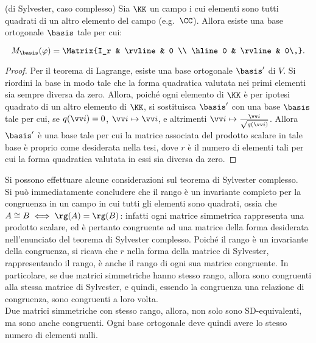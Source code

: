 \documentclass[11pt]{article}
\begin{document}
	\begin{theorem} (di Sylvester, caso complesso)
		Sia $\KK$ un campo i cui elementi sono tutti quadrati di un
		altro elemento del campo (e.g.~$\CC$). Allora esiste una base
		ortogonale $\basis$ tale per cui:
		
		\[ M_\basis(\varphi) = \Matrix{I_r & \rvline & 0 \\ \hline 0 & \rvline & 0\,}. \]
	\end{theorem}

	\begin{proof}
		Per il teorema di Lagrange, esiste una base ortogonale $\basis'$ di $V$.
		Si riordini la base in modo tale che la forma quadratica valutata nei primi elementi sia sempre diversa da zero. Allora, poiché ogni
		elemento di $\KK$ è per ipotesi quadrato di un altro elemento
		di $\KK$, si sostituisca $\basis'$ con una base $\basis$ tale per
		cui, se $q(\vv i) = 0$, $\vv i \mapsto \vv i$, e altrimenti
		$\vv i \mapsto \frac{\vv i}{\sqrt{q(\vv i)}}$. Allora $\basis'$
		è una base tale per cui la matrice associata del prodotto scalare
		in tale base è proprio come desiderata nella tesi, dove $r$ è
		il numero di elementi tali per cui la forma quadratica valutata
		in essi sia diversa da zero.
	\end{proof}

	\begin{remark}
		Si possono effettuare alcune considerazioni sul teorema di Sylvester
		complesso. \\
		
		\li Si può immediatamente concludere che il rango è un invariante
		completo per la congruenza in un campo in cui tutti gli elementi
		sono quadrati, ossia che $A \cong B \iff \rg(A) = \rg(B)$: infatti
		ogni matrice simmetrica rappresenta una prodotto scalare, ed è
		pertanto congruente ad una matrice della forma desiderata
		nell'enunciato del teorema di Sylvester complesso. Poiché il rango
		è un invariante della congruenza, si ricava che $r$ nella forma
		della matrice di Sylvester, rappresentando il rango, è anche
		il rango di ogni sua matrice congruente. In particolare, se due
		matrici simmetriche hanno stesso rango, allora sono congruenti
		alla stessa matrice di Sylvester, e quindi, essendo la congruenza
		una relazione di congruenza, sono congruenti a loro volta. \\
		\li Due matrici simmetriche con stesso rango, allora, non solo
		sono SD-equivalenti, ma sono anche congruenti.
		\li Ogni base ortogonale deve quindi avere lo stesso numero
		di elementi nulli.
	\end{remark}
	
\end{document}
